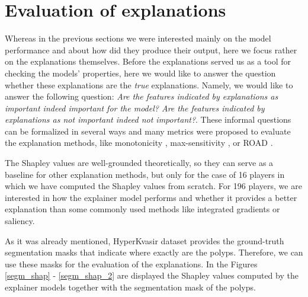 \documentclass[magisterska,en]{pracamgr}
\begin{document}
\section{Evaluation of explanations}\label{s:evaluation}
Whereas in the previous sections we were interested mainly on the model performance and about how did they produce their output, here we focus rather on the explanations themselves. Before the explanations served us as a tool for checking the models' properties, here we would like to answer the question whether these explanations are the \textit{true} explanations. Namely, we would like to answer the following question: \textit{Are the features indicated by explanations as important indeed important for the model? Are the features indicated by explanations as not important indeed not important?}. These informal questions can be formalized in several ways and many metrics were proposed to evaluate the explanation methods, like monotonicity \cite{DBLP:journals/corr/abs-2007-07584}, max-sensitivity \cite{DBLP:conf/nips/YehHSIR19}, 
or ROAD \cite{DBLP:conf/icml/RongLBKK22}. 

The Shapley values are well-grounded theoretically, so they can serve as a baseline for other explanation methods, but only for the case of 16 players in which we have computed the Shapley values from scratch. For 196 players, we are interested in how the explainer model performs and whether it provides a better explanation than some commonly used methods like integrated gradients or saliency.





As it was already mentioned, HyperKvasir dataset provides the ground-truth segmentation masks that indicate where exactly are the polyps. Therefore, we can use these masks for the evaluation of the explanations. In the Figures \ref{segm_shap} -  \ref{segm_shap_2} are displayed the Shapley values computed by the explainer models together with the segmentation mask of the polyps. 
\end{document}
